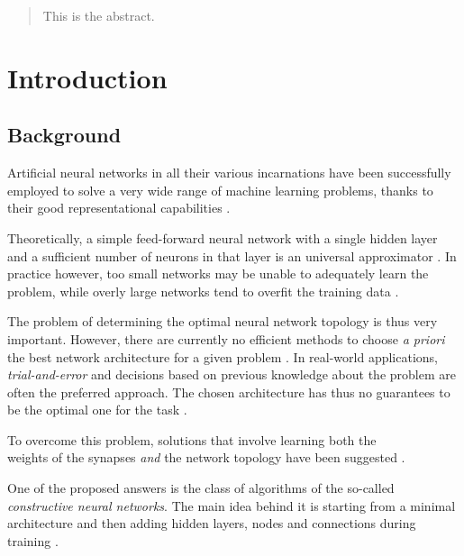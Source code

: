 \documentclass[11pt,a4paper]{report}
\begin{document}
	
	
	
	\begin{abstract}
		This is the abstract.
	\end{abstract}
	
	
	\tableofcontents

	\printnomenclature
	\listoffigures
	\listoftables
	
	
	\chapter{Introduction}
		\section{Background}
			\label{sec:background}
			Artificial neural networks in all their various incarnations have been successfully employed to solve a very wide range of machine learning problems, thanks to their good representational capabilities \cite{sharma2010constructive}.
		
			Theoretically, a simple feed-forward neural network with a single hidden layer and a sufficient number of neurons in that layer is an universal approximator \cite{hornik1989multilayer,kuurkova1992kolmogorov}. In practice however, too small networks may be unable to adequately learn the problem, while overly large networks tend to overfit the training data \cite{parekh2000constructive}.
		
			The problem of determining the optimal neural network topology is thus very important. However, there are currently no efficient methods to choose \emph{a priori} the best network architecture for a given problem \cite{parekh2000constructive}. In real-world applications, \emph{trial-and-error} and decisions based on previous knowledge about the problem are often the preferred approach. The chosen architecture has thus no guarantees to be the optimal one for the task \cite{sharma2010constructive}.
		
			To overcome this problem, solutions that involve learning both the\\weights of the synapses \emph{and} the network topology have been suggested \cite{parekh2000constructive}.
		
			One of the proposed answers is the class of algorithms of the so-called \emph{constructive neural networks}. The main idea behind it is starting from a minimal architecture and then adding hidden layers, nodes and connections during training \cite{kotsiantis2007supervised,sharma2010constructive}.
		
\end{document}
